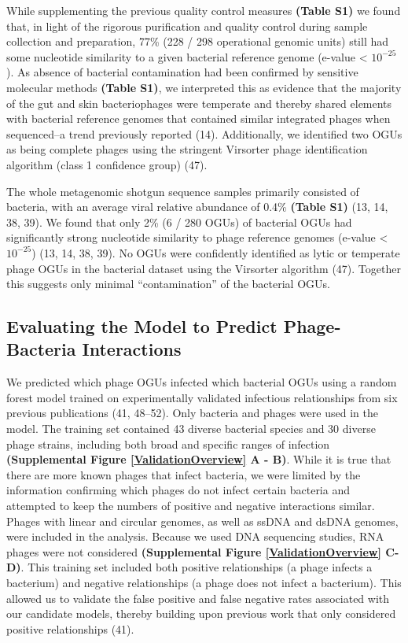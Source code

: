 \documentclass[12pt,]{article}
\begin{document}
While supplementing the previous quality control measures \textbf{(Table
S1)} we found that, in light of the rigorous purification and quality
control during sample collection and preparation, 77\% (228 / 298
operational genomic units) still had some nucleotide similarity to a
given bacterial reference genome (e-value \textless{} \(10^{-25}\)). As
absence of bacterial contamination had been confirmed by sensitive
molecular methods \textbf{(Table S1)}, we interpreted this as evidence
that the majority of the gut and skin bacteriophages were temperate and
thereby shared elements with bacterial reference genomes that contained
similar integrated phages when sequenced--a trend previously reported
(14). Additionally, we identified two OGUs as being complete phages
using the stringent Virsorter phage identification algorithm (class 1
confidence group) (47).

The whole metagenomic shotgun sequence samples primarily consisted of
bacteria, with an average viral relative abundance of 0.4\%
\textbf{(Table S1)} (13, 14, 38, 39). We found that only 2\% (6 / 280
OGUs) of bacterial OGUs had significantly strong nucleotide similarity
to phage reference genomes (e-value \textless{} \(10^{-25}\)) (13, 14,
38, 39). No OGUs were confidently identified as lytic or temperate phage
OGUs in the bacterial dataset using the Virsorter algorithm (47).
Together this suggests only minimal ``contamination'' of the bacterial
OGUs.

\subsection{Evaluating the Model to Predict Phage-Bacteria
Interactions}\label{evaluating-the-model-to-predict-phage-bacteria-interactions}

We predicted which phage OGUs infected which bacterial OGUs using a
random forest model trained on experimentally validated infectious
relationships from six previous publications (41, 48--52). Only bacteria
and phages were used in the model. The training set contained 43 diverse
bacterial species and 30 diverse phage strains, including both broad and
specific ranges of infection \textbf{(Supplemental Figure
\ref{ValidationOverview} A - B)}. While it is true that there are more
known phages that infect bacteria, we were limited by the information
confirming which phages do not infect certain bacteria and attempted to
keep the numbers of positive and negative interactions similar. Phages
with linear and circular genomes, as well as ssDNA and dsDNA genomes,
were included in the analysis. Because we used DNA sequencing studies,
RNA phages were not considered \textbf{(Supplemental Figure
\ref{ValidationOverview} C-D)}. This training set included both positive
relationships (a phage infects a bacterium) and negative relationships
(a phage does not infect a bacterium). This allowed us to validate the
false positive and false negative rates associated with our candidate
models, thereby building upon previous work that only considered
positive relationships (41).
\end{document}
